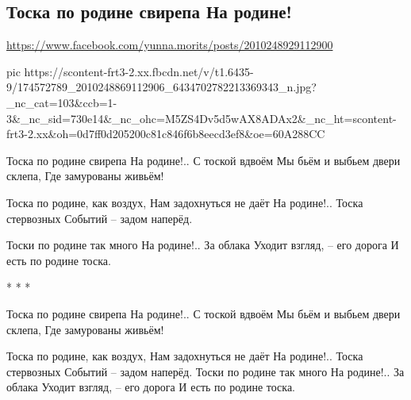  
 
 
 
 

\subsection{Тоска по родине свирепа На родине!}
\url{https://www.facebook.com/yunna.morits/posts/2010248929112900}

\ifcmt
  pic https://scontent-frt3-2.xx.fbcdn.net/v/t1.6435-9/174572789_2010248869112906_6434702782213369343_n.jpg?_nc_cat=103&ccb=1-3&_nc_sid=730e14&_nc_ohc=M5ZS4Dv5d5wAX8ADAx2&_nc_ht=scontent-frt3-2.xx&oh=0d7ff0d205200c81c846f6b8eecd3ef8&oe=60A288CC
\fi

Тоска по родине свирепа
На родине!.. С тоской вдвоём
Мы бьём и выбьем двери склепа,
Где замурованы живьём!

Тоска по родине, как воздух,
Нам задохнуться не даёт
На родине!.. Тоска стервозных
Событий – задом наперёд.

Тоски по родине так много
На родине!.. За облака
Уходит взгляд, – его дорога
И есть по родине тоска. 

* * *

Тоска по родине свирепа
На родине!.. С тоской вдвоём
Мы бьём и выбьем двери склепа,
Где замурованы живьём!

Тоска по родине, как воздух,
Нам задохнуться не даёт
На родине!.. Тоска стервозных
Событий – задом наперёд.
Тоски по родине так много
На родине!.. За облака
Уходит взгляд, – его дорога
И есть по родине тоска.
